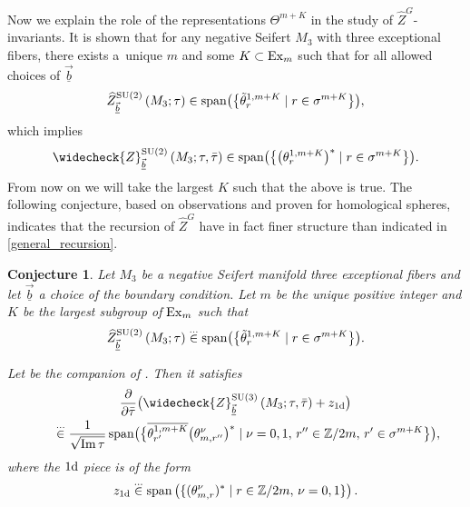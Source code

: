 \documentclass[pdftex]{sigma}
\newcommand{\ZZ}{\mathbb{Z}}
\newcommand{\Zhlong}[3]{\ensuremath{\widehat{Z}^{#1}_{#2}\left(#3;\tau\right)}}
\newcommand{\Zchlong}[3]{\ensuremath{\widecheck{Z}^{#1}_{#2}\left(#3;\tau,\bar{\tau}\right)}}
\def\bv{{\vec{\underline{b}}}}
\newtheorem{conj}[thm]{Conjecture}
\theoremstyle{definition}
\numberwithin{equation}{section}
\begin{document}
Now we explain the role of the representations $\Theta^{m+K}$ in the study of $\widehat Z^G$-invariants.
It is shown \cite{bringmann2019quantum,cheng20193d} that for any negative Seifert $M_3$ with three exceptional fibers, there exists a~unique $m$ and some $K\subset {\rm Ex}_m$ such that for all allowed choices of $\bv$
\begin{equation}\label{eqn:intro_Weyl1}
\Zhlong{{\rm SU}(2)}{\bv}{M_3} \in \operatorname{span}\bigl(
 \bigl\{\tilde\theta_{r}^{1,m+K}\mid r \in \sigma^{m+K} \bigr\}\bigr),
\end{equation}
 which implies
\begin{equation}\label{eqn:intro_Weyl2}
 \Zchlong{{\rm SU}(2)}{\bv}{M_3} \in \operatorname{span}
 \bigl(\bigl\{\bigl(\theta^{1,m+K}_r\bigr)^\ast\mid r \in \sigma^{m+K} \bigr\}\bigr).
\end{equation}
 From now on we will take the largest $K$ such that the above is true. The following conjecture, based on observations and proven for homological spheres, indicates that the recursion of $\widehat Z^G$ have in fact finer structure than indicated in \eqref{general_recursion}.
\begin{conj}\label{conj_rec}
Let $M_3$ be a negative Seifert manifold three exceptional fibers and let $\bv$ a choice of the boundary condition. Let $m$ be the unique positive integer and $K$ be the largest subgroup of ${\rm Ex}_m$ such that
\[
 \Zhlong{{\rm SU}(2)}{\bv}{M_3} \stackrel{\dots}{\in} \operatorname{span}\bigl(
 \bigl\{\tilde\theta_{r}^{1,m+K}\mid r \in \sigma^{m+K} \bigr\}\bigr) .
\]

Let \smash{$\Zchlong{{\rm SU}(3)}{\bv}{M_3}$} be the companion of \smash{$\widehat Z^{{\rm SU}(3)}_{\bv}(\tau;M_3)$}. Then it satisfies
\begin{gather}
 {\frac{\partial}{ \partial \bar \tau}}
 \bigl( \Zchlong{{\rm SU}(3)}{\bv}{M_3} + z_{1\rm d}\bigr)\nonumber \\
 \qquad\stackrel{\dots}{\in}
 {\frac{1}{\sqrt{\operatorname{Im} \tau}}} \operatorname{span}\bigl(\bigl\{ \overline{\theta^{1,m+K}_{r'}} \bigl({\theta^{\nu}_{m,r''}}\bigr)^\ast \mid \nu=0,1, \,r'' \in \ZZ/2m,\, r' \in \sigma^{m+K} \bigr\} \bigr),\label{eqn:conj:recursive}
\end{gather}
where the $1\rm d$ piece is of the form
\begin{equation}\label{intro_1dpiece}
 z_{1\rm d}\stackrel{\dots}{\in} \operatorname{span}\left(\{ ({\theta^{\nu}_{m,r}})^\ast \mid r \in \ZZ/2m,\, \nu=0,1 \} \right).
\end{equation}
\end{conj}
\end{document}
